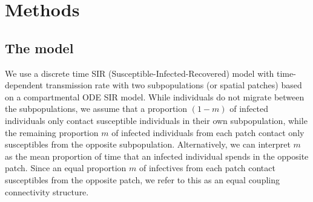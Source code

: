 \documentclass[12pt]{article}
\begin{document}
\section{Methods} \label{sec:methods}
\subsection{The model} \label{ss:deter_model}
We use a discrete time SIR (Susceptible-Infected-Recovered) model with time-dependent transmission rate with two subpopulations (or spatial patches) based on a compartmental ODE SIR model. While individuals do not migrate between the subpopulations, we assume that a proportion $(1-m)$ of infected individuals only contact susceptible individuals in their own subpopulation, while the remaining proportion $m$ of infected individuals from each patch contact only susceptibles from the opposite subpopulation. Alternatively, we can interpret $m$ as the mean proportion of time that an infected individual spends in the opposite patch. Since an equal proportion $m$ of infectives from each patch contact susceptibles from the opposite patch, we refer to this as an equal coupling connectivity structure. 
\end{document}
